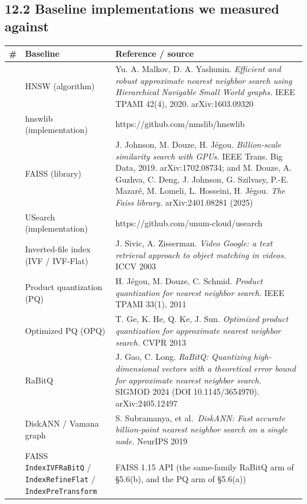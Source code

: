 \documentclass[
  10pt,
]{article}
\newcounter{none} %
\begin{document}
\subsection{12.2 Baseline implementations we measured
against}\label{baseline-implementations-we-measured-against}

{\def\LTcaptype{none} %
\begin{longtable}[]{@{}
  >{\raggedright\arraybackslash}p{}
  >{\raggedright\arraybackslash}p{}
  >{\raggedright\arraybackslash}p{}@{}}
\toprule\noalign{}
\begin{minipage}[b]{\linewidth}\raggedright
\#
\end{minipage} & \begin{minipage}[b]{\linewidth}\raggedright
Baseline
\end{minipage} & \begin{minipage}[b]{\linewidth}\raggedright
Reference / source
\end{minipage} \\
\midrule\noalign{}
\endhead
\bottomrule\noalign{}
\endlastfoot
4 & HNSW (algorithm) & Yu. A. Malkov, D. A. Yashunin. \emph{Efficient
and robust approximate nearest neighbor search using Hierarchical
Navigable Small World graphs.} IEEE TPAMI 42(4), 2020.
arXiv:1603.09320 \\
5 & hnswlib (implementation) & https://github.com/nmslib/hnswlib \\
6 & FAISS (library) & J. Johnson, M. Douze, H. Jégou.
\emph{Billion-scale similarity search with GPUs.} IEEE Trans. Big Data,
2019. arXiv:1702.08734; and M. Douze, A. Guzhva, C. Deng, J. Johnson, G.
Szilvasy, P.-E. Mazaré, M. Lomeli, L. Hosseini, H. Jégou. \emph{The
Faiss library.} arXiv:2401.08281 (2025) \\
7 & USearch (implementation) & https://github.com/unum-cloud/usearch \\
8 & Inverted-file index (IVF / IVF-Flat) & J. Sivic, A. Zisserman.
\emph{Video Google: a text retrieval approach to object matching in
videos.} ICCV 2003 \\
9 & Product quantization (PQ) & H. Jégou, M. Douze, C. Schmid.
\emph{Product quantization for nearest neighbor search.} IEEE TPAMI
33(1), 2011 \\
10 & Optimized PQ (OPQ) & T. Ge, K. He, Q. Ke, J. Sun. \emph{Optimized
product quantization for approximate nearest neighbor search.} CVPR
2013 \\
11 & RaBitQ & J. Gao, C. Long. \emph{RaBitQ: Quantizing high-dimensional
vectors with a theoretical error bound for approximate nearest neighbor
search.} SIGMOD 2024 (DOI 10.1145/3654970). arXiv:2405.12497 \\
12 & DiskANN / Vamana graph & S. Subramanya, et al.~\emph{DiskANN: Fast
accurate billion-point nearest neighbor search on a single node.}
NeurIPS 2019 \\
13 & FAISS \texttt{IndexIVFRaBitQ} / \texttt{IndexRefineFlat} /
\texttt{IndexPreTransform} & FAISS 1.15 API (the same-family RaBitQ arm
of §5.6(b), and the PQ arm of §5.6(a)) \\
\end{longtable}
}
\end{document}
